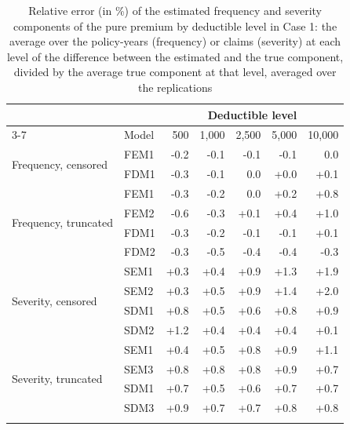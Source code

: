 \documentclass[11pt]{article}
\begin{document}
\begin{table}[!ht]
\footnotesize
\centering
{\color{blue}
\begin{tabular}{llrrrrr}
\toprule
 & & \multicolumn{5}{c}{Deductible level} \\
\cmidrule(lr){3-7}
 & Model &    500 &  1,000 &  2,500 &  5,000 & 10,000 \\
\midrule
\multirow{2}{*}{Frequency, censored} & FEM1 & -0.2 & -0.1 & -0.1 & -0.1 & 0.0 \\
 & FDM1 & -0.3 & -0.1 & 0.0 & +0.0 & +0.1 \\
\midrule
\multirow{4}{*}{Frequency, truncated} & FEM1 & -0.3 & -0.2 & 0.0 & +0.2 & +0.8 \\
 & FEM2 & -0.6 & -0.3 & +0.1 & +0.4 & +1.0 \\
 & FDM1 & -0.3 & -0.2 & -0.1 & -0.1 & +0.1 \\
 & FDM2 & -0.3 & -0.5 & -0.4 & -0.4 & -0.3 \\
\midrule
\multirow{4}{*}{Severity, censored} & SEM1 & +0.3 & +0.4 & +0.9 & +1.3 & +1.9 \\
 & SEM2 & +0.3 & +0.5 & +0.9 & +1.4 & +2.0 \\
 & SDM1 & +0.8 & +0.5 & +0.6 & +0.8 & +0.9 \\
 & SDM2 & +1.2 & +0.4 & +0.4 & +0.4 & +0.1 \\
\midrule
\multirow{4}{*}{Severity, truncated} & SEM1 & +0.4 & +0.5 & +0.8 & +0.9 & +1.1 \\
 & SEM3 & +0.8 & +0.8 & +0.8 & +0.9 & +0.7 \\
 & SDM1 & +0.7 & +0.5 & +0.6 & +0.7 & +0.7 \\
 & SDM3 & +0.9 & +0.7 & +0.7 & +0.8 & +0.8 \\
\hhline{=======}
\end{tabular}
}
\caption{Relative error (in \%) of the estimated frequency and severity components of the pure premium by deductible level in Case 1: the average over the policy-years (frequency) or claims (severity) at each level of the difference between the estimated and the true component, divided by the average true component at that level, averaged over the replications}\label{tab:bylevel1}
\end{table}
\end{document}
